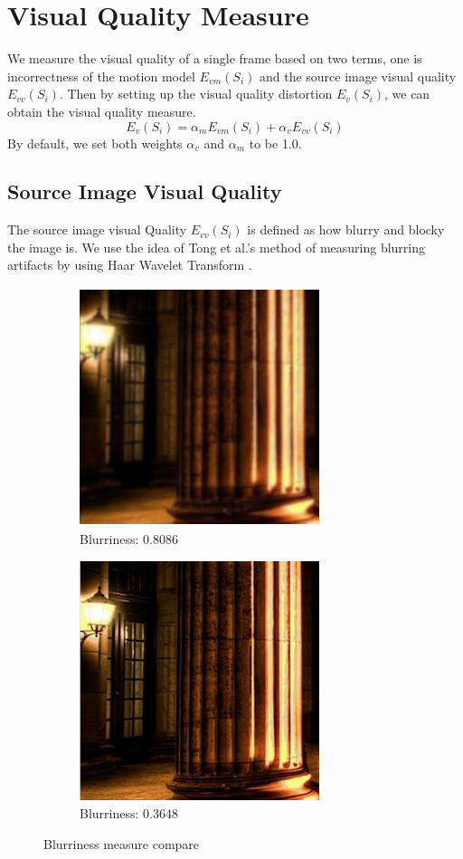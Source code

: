 \documentclass[12pt]{article}
\begin{document}
\section{Visual Quality Measure}
We measure the visual quality of a single frame based on two terms, one is incorrectness of the motion model $\mathit{E_{vm}(S_i)}$ and the source image visual quality $\mathit{E_{vv}(S_i)}$. Then by setting up the visual quality distortion $\mathit{E_v(S_i)}$, we can obtain the visual quality measure.
\begin{equation}
\mathit{E_v(S_i)} = \alpha_m\mathit{E_{vm}(S_i)} + \alpha_v\mathit{E_{vv}(S_i)}
\end{equation}
By default, we set both weights $\alpha_v$ and $\alpha_m$ to be 1.0.
\subsection{Source Image Visual Quality}
The source image visual Quality $\mathit{E_{vv}(S_i)}$ is defined as how blurry and blocky the image is. We use the idea of Tong et al.'s method of measuring blurring artifacts by using Haar Wavelet Transform \cite{Tong}.
\begin{figure}[htbp]
	\begin{subfigure}[b]{0.49 \textwidth}
	\centering
	\includegraphics[width=7cm, height=7cm]{a}
	\caption{Blurriness: 0.8086}
	\label{default}
	\end{subfigure}
	\hspace{1cm}
	\begin{subfigure}[b]{0.49 \textwidth}
	\centering
	\includegraphics[width=7cm, height=7cm]{b}
	\caption{Blurriness: 0.3648}
	\label{default}
	\end{subfigure}
\caption{Blurriness measure compare}
\end{figure}
\end{document}
